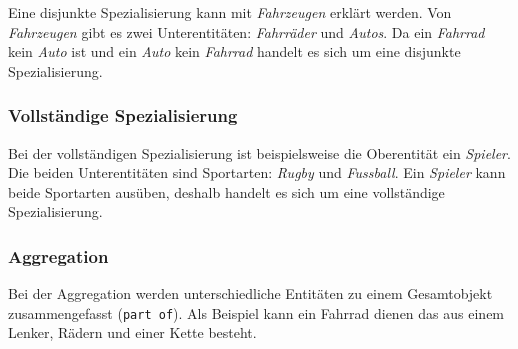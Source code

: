 Eine disjunkte Spezialisierung kann mit \emph{Fahrzeugen} erklärt werden. Von \emph{Fahrzeugen} gibt es zwei Unterentitäten: \emph{Fahrräder} und \emph{Autos}. Da ein \emph{Fahrrad} kein \emph{Auto} ist und ein \emph{Auto} kein \emph{Fahrrad} handelt es sich um eine disjunkte Spezialisierung.

\subsubsection{Vollständige Spezialisierung}

Bei der vollständigen Spezialisierung ist beispielsweise die Oberentität ein \emph{Spieler}. Die beiden Unterentitäten sind Sportarten: \emph{Rugby} und \emph{Fussball}. Ein \emph{Spieler} kann beide Sportarten ausüben, deshalb handelt es sich um eine vollständige Spezialisierung. 

\subsubsection{Aggregation}

Bei der Aggregation werden unterschiedliche Entitäten zu einem Gesamtobjekt zusammengefasst (\texttt{part of}). Als Beispiel kann ein Fahrrad dienen das aus einem Lenker, Rädern und einer Kette besteht.
